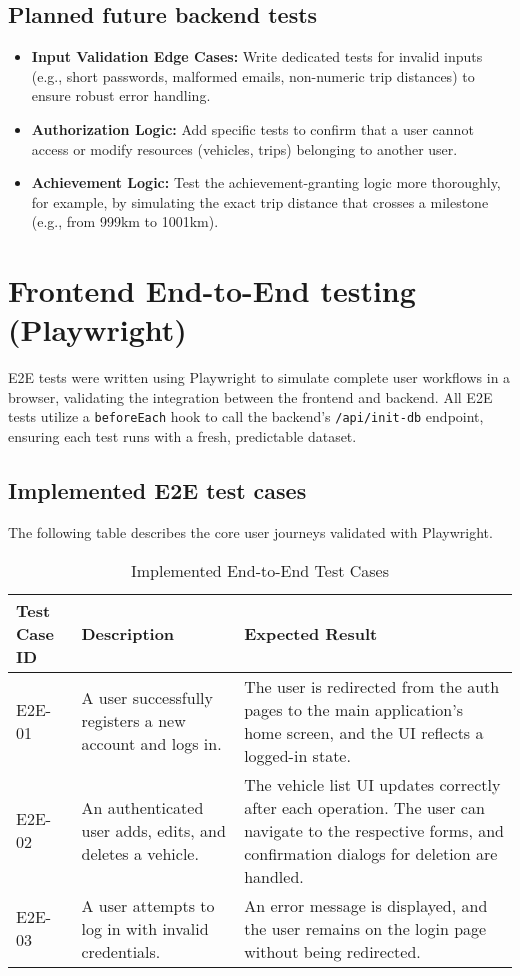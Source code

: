 \subsection{Planned future backend tests}
\begin{itemize}
    \item \textbf{Input Validation Edge Cases:} Write dedicated tests for invalid inputs (e.g., short passwords, malformed emails, non-numeric trip distances) to ensure robust error handling.
    \item \textbf{Authorization Logic:} Add specific tests to confirm that a user cannot access or modify resources (vehicles, trips) belonging to another user.
    \item \textbf{Achievement Logic:} Test the achievement-granting logic more thoroughly, for example, by simulating the exact trip distance that crosses a milestone (e.g., from 999km to 1001km).
\end{itemize}

\section{Frontend End-to-End testing (Playwright)}

E2E tests were written using Playwright to simulate complete user workflows in a browser, validating the integration between the frontend and backend. All E2E tests utilize a \texttt{beforeEach} hook to call the backend's \texttt{/api/init-db} endpoint, ensuring each test runs with a fresh, predictable dataset.

\subsection{Implemented E2E test cases}
The following table describes the core user journeys validated with Playwright.

\begin{table}[h!]
    \centering
    \caption{Implemented End-to-End Test Cases}
    \begin{tabular}{|p{}|p{}|p{}|}
        \hline
        \textbf{Test Case ID} & \textbf{Description} & \textbf{Expected Result} \\
        \hline \hline
        E2E-01 & A user successfully registers a new account and logs in. & The user is redirected from the auth pages to the main application's home screen, and the UI reflects a logged-in state. \\
        \hline
        E2E-02 & An authenticated user adds, edits, and deletes a vehicle. & The vehicle list UI updates correctly after each operation. The user can navigate to the respective forms, and confirmation dialogs for deletion are handled. \\
        \hline
        E2E-03 & A user attempts to log in with invalid credentials. & An error message is displayed, and the user remains on the login page without being redirected. \\
        \hline
    \end{tabular}
\end{table}

